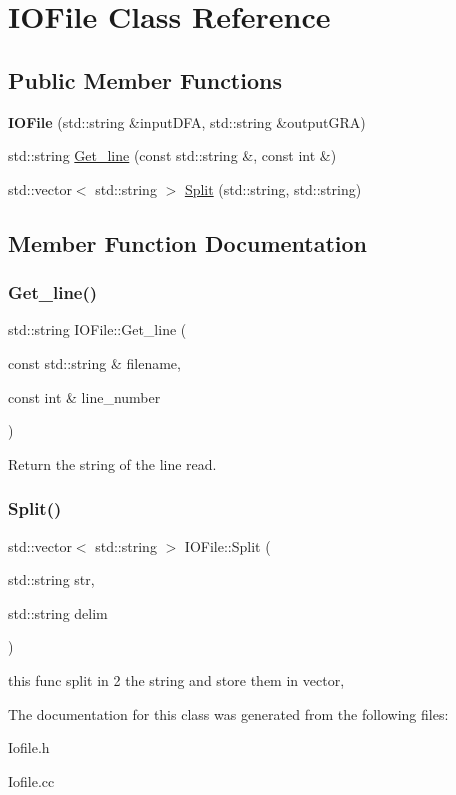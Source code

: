 \hypertarget{classIOFile}{}\section{I\+O\+File Class Reference}
\label{classIOFile}
\subsection*{Public Member Functions}
\begin{DoxyCompactItemize}
\item 
\mbox{\label{classIOFile_a4db13f6646d3b44647758fd631d2f885}} 
{\bfseries I\+O\+File} (std\+::string \&input\+D\+FA, std\+::string \&output\+G\+RA)
\item 
std\+::string \hyperlink{classIOFile_aa8710ee34b8e480e4826cdc12a4a7796}{Get\+\_\+line} (const std\+::string \&, const int \&)
\item 
std\+::vector$<$ std\+::string $>$ \hyperlink{classIOFile_ae2d1a905a0f4c3b5ecf73751361a04f8}{Split} (std\+::string, std\+::string)
\end{DoxyCompactItemize}


\subsection{Member Function Documentation}
\mbox{\label{classIOFile_aa8710ee34b8e480e4826cdc12a4a7796}} 
\subsubsection{\texorpdfstring{Get\+\_\+line()}{Get\_line()}}
{\footnotesize\ttfamily std\+::string I\+O\+File\+::\+Get\+\_\+line (\begin{DoxyParamCaption}\item[{const std\+::string \&}]{filename,  }\item[{const int \&}]{line\+\_\+number }\end{DoxyParamCaption})}

Return the string of the line read. \mbox{\label{classIOFile_ae2d1a905a0f4c3b5ecf73751361a04f8}} 
\subsubsection{\texorpdfstring{Split()}{Split()}}
{\footnotesize\ttfamily std\+::vector$<$ std\+::string $>$ I\+O\+File\+::\+Split (\begin{DoxyParamCaption}\item[{std\+::string}]{str,  }\item[{std\+::string}]{delim }\end{DoxyParamCaption})}

this func split in 2 the string and store them in vector, 

The documentation for this class was generated from the following files\+:\begin{DoxyCompactItemize}
\item 
Iofile.\+h\item 
Iofile.\+cc\end{DoxyCompactItemize}

